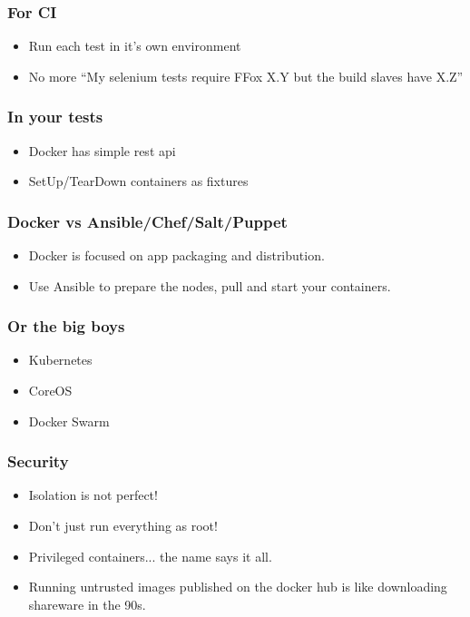 \documentclass{beamer}
\begin{document}
\begin{frame}
  \frametitle{For CI}
  \begin{itemize}
  \item Run each test in it's own environment
  \item No more ``My selenium tests require FFox X.Y but the build slaves have X.Z''
  \end{itemize}
\end{frame}

\begin{frame}
  \frametitle{In your tests}
  \begin{itemize}
  \item Docker has simple rest api
  \item SetUp/TearDown containers as fixtures
  \end{itemize}
\end{frame}

\begin{frame}
  \frametitle{Docker vs Ansible/Chef/Salt/Puppet}
  \begin{itemize}
  \item Docker is focused on app packaging and distribution.
  \item Use Ansible to prepare the nodes, pull and start your containers.
  \end{itemize}
\end{frame}

\begin{frame}
  \frametitle{Or the big boys}
  \begin{itemize}
  \item Kubernetes
  \item CoreOS
  \item Docker Swarm
  \end{itemize}
\end{frame}

\begin{frame}
  \frametitle{Security}
  \begin{itemize}
  \item Isolation is not perfect!
  \item Don't just run everything as root!
  \item Privileged containers... the name says it all.
  \item Running untrusted images published on the docker hub is like downloading shareware in the 90s.
  \end{itemize}
\end{frame}
\end{document}
